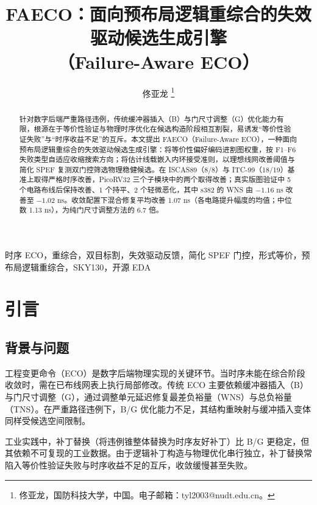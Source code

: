 \documentclass[journal]{IEEEtran}
\title{FAECO：面向预布局逻辑重综合的失效驱动候选生成引擎\\
（Failure-Aware ECO）}
\author{佟亚龙%
\thanks{佟亚龙，国防科技大学，中国。电子邮箱：tyl2003@nudt.edu.cn。}}
\begin{document}
\maketitle

\sloppy

\begin{abstract}
针对数字后端严重路径违例，传统缓冲器插入（B）与门尺寸调整（G）优化能力有限，根源在于等价性验证与物理时序优化在候选构造阶段相互割裂，易诱发“等价性验证失败”与“时序收益不足”的互斥。本文提出 FAECO（Failure-Aware ECO），一种面向预布局逻辑重综合的失效驱动候选生成引擎：将等价性偏好编码进割图权重，按 F1--F6 失败类型自适应收缩搜索方向；将估计线载嵌入内环接受准则，以理想线网改善阈值与简化 SPEF 复测双门控筛选物理稳健候选。在 ISCAS89（8/8）与 ITC-99（18/19）基准上取得严格时序改善，PicoRV32 三个子模块中的两个取得改善；真实版图验证中 5 个电路布线后保持改善、1 个持平、2 个轻微恶化，其中 s382 的 WNS 由 $-1.16$ ns 改善至 $-1.02$ ns。收敛配置下混合修复平均改善 1.07 ns（各电路提升幅度的均值；中位数 1.13 ns），为纯门尺寸调整方法的 6.7 倍。
\end{abstract}

\begin{IEEEkeywords}
时序 ECO，重综合，双目标割，失效驱动反馈，简化 SPEF 门控，形式等价，预布局逻辑重综合，SKY130，开源 EDA
\end{IEEEkeywords}

\section{引言}

\subsection{背景与问题}

工程变更命令（ECO）是数字后端物理实现的关键环节。当时序未能在综合阶段收敛时，需在已布线网表上执行局部修改。传统 ECO 主要依赖缓冲器插入（B）与门尺寸调整（G），通过调整单元延迟修复最差负裕量（WNS）与总负裕量（TNS）。在严重路径违例下，B/G 优化能力不足，其结构重映射与缓冲插入变体同样受候选空间限制\cite{chen2012metal,chen2012fixability,liang2012buffer,ho2010eco}。

工业实践中，补丁替换（将违例锥整体替换为时序友好补丁）比 B/G 更稳定，但其依赖不可复现的工业数据。由于逻辑补丁构造与物理优化串行独立，补丁替换常陷入等价性验证失败与时序收益不足的互斥，收敛缓慢甚至失败。
\end{document}
